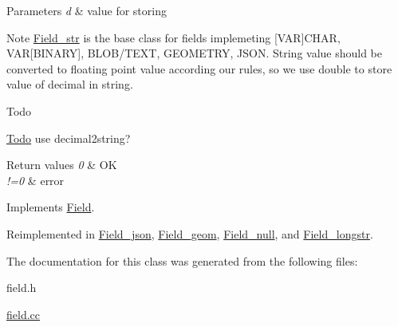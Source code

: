 \begin{DoxyParams}{Parameters}
{\em d} & value for storing\\
\hline
\end{DoxyParams}
\begin{DoxyNote}{Note}
\mbox{\hyperlink{classField__str}{Field\+\_\+str}} is the base class for fields implemeting \mbox{[}V\+AR\mbox{]}C\+H\+AR, V\+AR\mbox{[}B\+I\+N\+A\+RY\mbox{]}, B\+L\+O\+B/\+T\+E\+XT, G\+E\+O\+M\+E\+T\+RY, J\+S\+ON. String value should be converted to floating point value according our rules, so we use double to store value of decimal in string.
\end{DoxyNote}
\begin{DoxyRefDesc}{Todo}
\item[\mbox{\hyperlink{todo__todo000011}{Todo}}]use decimal2string?\end{DoxyRefDesc}



\begin{DoxyRetVals}{Return values}
{\em 0} & OK \\
\hline
{\em !=0} & error \\
\hline
\end{DoxyRetVals}


Implements \mbox{\hyperlink{classField}{Field}}.



Reimplemented in \mbox{\hyperlink{classField__json_a979954944f1ee5334945f83135acdb8e}{Field\+\_\+json}}, \mbox{\hyperlink{classField__geom_a898e7030c139559c40683399075788a5}{Field\+\_\+geom}}, \mbox{\hyperlink{classField__null_a67a8c81f634b920257aff8736ad6e00e}{Field\+\_\+null}}, and \mbox{\hyperlink{classField__longstr_accc080bab51e57cdcefc594a17cb13f5}{Field\+\_\+longstr}}.



The documentation for this class was generated from the following files\+:\begin{DoxyCompactItemize}
\item 
field.\+h\item 
\mbox{\hyperlink{field_8cc}{field.\+cc}}\end{DoxyCompactItemize}
